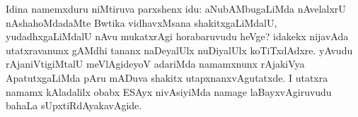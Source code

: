Idina namemxduru niMtiruva parxshenx idu: aNubAMbugaLiMda nAvelalxrU nAshahoMdadaMte Bwtika vidhavxMsana shakitxgaLiMdalU, yudadhxgaLiMdalU nAvu mukatxrAgi horabaruvudu heVge? idakekx nijavAda utatxravanunx gAMdhi tananx naDeyalUlx nuDiyalUlx koTiTxdAdxre. yAvudu rAjaniVtigiMtalU meVlAgideyoV adariMda namamxnunx rAjakiVya ApatutxgaLiMda pAru mADuva shakitx utapxnanxvAgutatxde. I utatxra namamx kAladalilx obabx ESAyx nivAsiyiMda namage laBayxvAgiruvudu bahaLa sUpxtiRdAyakavAgide.


